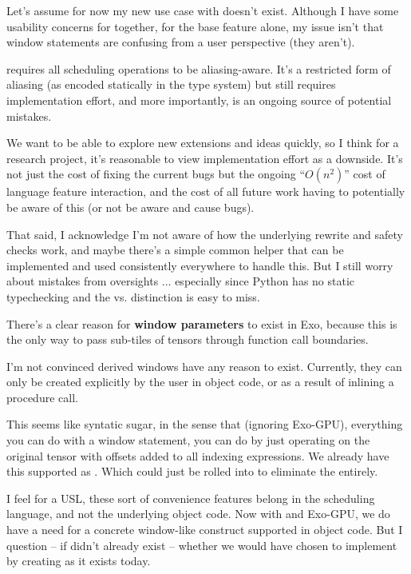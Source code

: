 \filbreak
{}

Let's assume for now my new use case with  doesn't exist.
Although I have some usability concerns for  together, for the base  feature alone, my issue isn't that window statements are confusing from a user perspective (they aren't).

\filbreak
{}  requires all scheduling operations to be aliasing-aware.
It's a restricted form of aliasing (as encoded statically in the type system) but still requires implementation effort, and more importantly, is an ongoing source of potential mistakes.

\filbreak
We want to be able to explore new extensions and ideas quickly, so I think for a research project, it's reasonable to view implementation effort as a downside.
It's not just the cost of fixing the current  bugs but the ongoing ``$O(n^2)$'' cost of language feature interaction, and the cost of all future work having to potentially be aware of this (or not be aware and cause bugs).

\filbreak
That said, I acknowledge I'm not aware of how the underlying rewrite and safety checks work, and maybe there's a simple common helper that can be implemented and used consistently everywhere to handle this.
But I still worry about mistakes from oversights ... especially since Python has no static typechecking and the  vs.  distinction is easy to miss.

\filbreak
{} There's a clear reason for \textbf{window parameters} to exist in Exo, because this is the only way to pass sub-tiles of tensors through function call boundaries.

\filbreak
I'm not convinced derived windows have any reason to exist.
Currently, they can only be created explicitly by the user in object code, or as a result of inlining a procedure call.

\filbreak
This seems like syntatic sugar, in the sense that (ignoring Exo-GPU), everything you can do with a window statement, you can do by just operating on the original tensor with offsets added to all indexing expressions.
We already have this supported as .
Which could just be rolled into  to eliminate the  entirely.

\filbreak
I feel for a USL, these sort of convenience features belong in the scheduling language, and not the underlying object code.
Now with  and Exo-GPU, we do have a need for a concrete window-like construct supported in object code.
But I question -- if  didn't already exist -- whether we would have chosen to implement  by creating  as it exists today.

